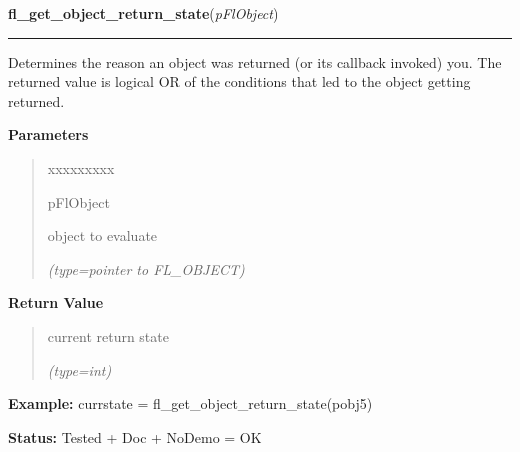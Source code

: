\hspace{.8\funcindent}\begin{boxedminipage}{\funcwidth}

    \raggedright \textbf{fl\_get\_object\_return\_state}(\textit{pFlObject})

    \vspace{-1.5ex}

    \rule{\textwidth}{0.5\fboxrule}
\setlength{\parskip}{2ex}
    Determines the reason an object was returned (or its callback invoked) 
    you. The returned value is logical OR of the conditions that led to the
    object getting returned.

\setlength{\parskip}{1ex}
      \textbf{Parameters}
      \vspace{-1ex}

      \begin{quote}
        \begin{Ventry}{xxxxxxxxx}

          \item[pFlObject]

          object to evaluate

            {\it (type=pointer to FL\_OBJECT)}

        \end{Ventry}

      \end{quote}

      \textbf{Return Value}
    \vspace{-1ex}

      \begin{quote}
      current return state

      {\it (type=int)}

      \end{quote}

\textbf{Example:} currstate = fl\_get\_object\_return\_state(pobj5)



\textbf{Status:} Tested + Doc + NoDemo = OK



    \end{boxedminipage}

    \label{xformslib:flbasic:fl_trigger_object}

    \vspace{0.5ex}

